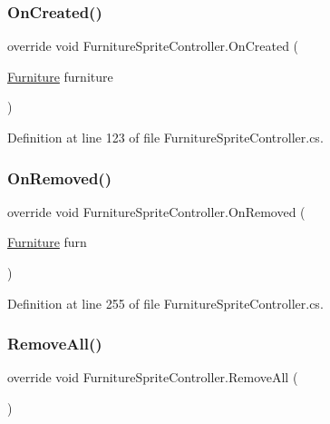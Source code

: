 \subsubsection{\texorpdfstring{On\+Created()}{OnCreated()}}
{\footnotesize\ttfamily override void Furniture\+Sprite\+Controller.\+On\+Created (\begin{DoxyParamCaption}\item[{\hyperlink{class_furniture}{Furniture}}]{furniture }\end{DoxyParamCaption})\hspace{0.3cm}{\ttfamily [protected]}}



Definition at line 123 of file Furniture\+Sprite\+Controller.\+cs.

\mbox{\label{class_furniture_sprite_controller_ae52dfd105397631a99bd6454282a91a7}} 
\subsubsection{\texorpdfstring{On\+Removed()}{OnRemoved()}}
{\footnotesize\ttfamily override void Furniture\+Sprite\+Controller.\+On\+Removed (\begin{DoxyParamCaption}\item[{\hyperlink{class_furniture}{Furniture}}]{furn }\end{DoxyParamCaption})\hspace{0.3cm}{\ttfamily [protected]}}



Definition at line 255 of file Furniture\+Sprite\+Controller.\+cs.

\mbox{\label{class_furniture_sprite_controller_aaa9325a8a0357fe3b64709ea437a3dce}} 
\subsubsection{\texorpdfstring{Remove\+All()}{RemoveAll()}}
{\footnotesize\ttfamily override void Furniture\+Sprite\+Controller.\+Remove\+All (\begin{DoxyParamCaption}{ }\end{DoxyParamCaption})\hspace{0.3cm}{\ttfamily [virtual]}}



